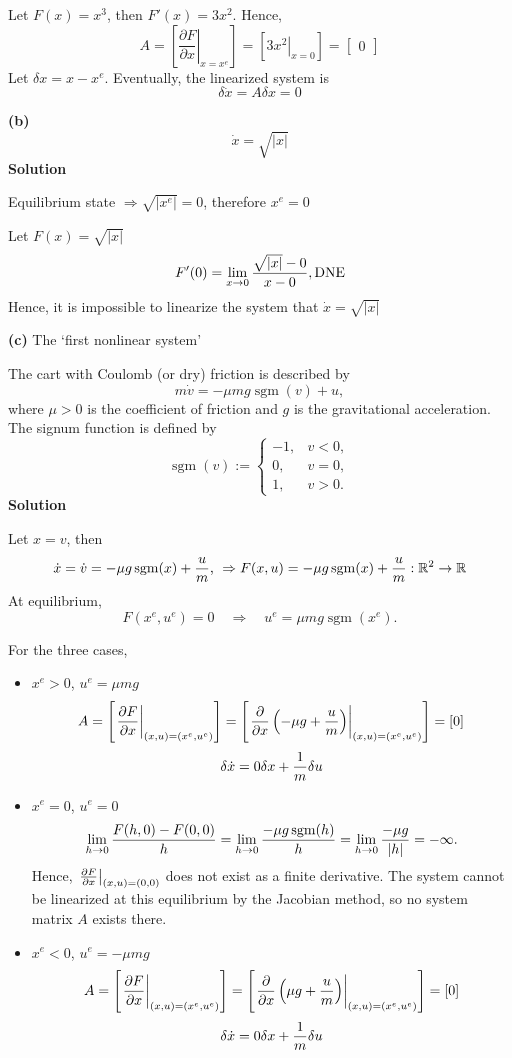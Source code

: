 \documentclass[12pt,a4paper]{article}
\begin{document}
Let $F(x) = x^3$, then $F'(x) = 3x^2$. Hence,
\[
A = \left[\left.\frac{\partial F}{\partial x}\right|_{x = x^e}\right]
= \left[\left.3x^2\right|_{x = 0}\right]
= \begin{bmatrix}0\end{bmatrix}
\]
Let $\delta x = x - x^e$. Eventually, the linearized system is
\[
\delta\dot x = A\delta x = 0
\]

\textbf{(b)}
\[\dot x=\sqrt{|x|}\]
\textbf{Solution}

Equilibrium state $\Rightarrow \sqrt{|x^e|} = 0$, therefore $x^e = 0$

Let $F(x) = \sqrt{|x|}$
\[
F'(0) = \lim_{x\to0} { \sqrt{|x|} - 0 \over x - 0}, \text{DNE}
\]
Hence, it is impossible to linearize the system that $\dot x = \sqrt{|x|}$ 

\par\vspace{1.8cm}

\textbf{(c)} The `first nonlinear system'

The cart with Coulomb (or dry) friction is described by
\[
m\dot v=-\mu mg\operatorname{sgm}(v)+u,
\]
where $\mu>0$ is the coefficient of friction and $g$ is the gravitational
acceleration. The signum function is defined by
\[
\operatorname{sgm}(v):=
\begin{cases}
-1,&v<0,\\
0,&v=0,\\
1,&v>0.
\end{cases}
\]
\textbf{Solution}

Let $x = v$, then
\[
\dot x = \dot v = -\mu g \operatorname{sgm}(x) + { u\over m} \text{, } \Rightarrow F(x, u) = -\mu g \operatorname{sgm}(x) + {u \over m}: \mathbb R^2 \to \mathbb R
\]
At equilibrium,
\[
F(x^e,u^e)=0 \quad\Rightarrow\quad u^e=\mu mg\operatorname{sgm}(x^e).
\]

For the three cases,
\begin{itemize}
	\item $x^e > 0$, $u^e = \mu mg$
	\[
	A = \left[\left.{\partial F\over\partial x}\right|_{(x,u)=(x^e,u^e)}\right]
	= \left[\left.{\partial\over\partial x}\left(-\mu g+{u\over m}\right)\right|_{(x,u)=(x^e,u^e)}\right]
	= [0]
	\]
	\[
	\delta \dot x = 0 \delta x + {1\over m} \delta u
	\]
	\item $x^e = 0$, $u^e = 0$
	\[
	\lim_{h\to0}{F(h,0)-F(0,0)\over h}
	=\lim_{h\to0}{-\mu g\operatorname{sgm}(h)\over h}
	=\lim_{h\to0}{-\mu g\over |h|}=-\infty.
	\]
	Hence, $\left.{\partial F\over\partial x}\right|_{(x,u)=(0,0)}$
	does not exist as a finite derivative. The system cannot be linearized
	at this equilibrium by the Jacobian method, so no system matrix $A$ exists there.
	\item $x^e < 0$, $ u^e = -\mu mg$
	\[
	A = \left[\left.{\partial F\over\partial x}\right|_{(x,u)=(x^e,u^e)}\right]
	= \left[\left.{\partial\over\partial x}\left(\mu g+{u\over m}\right)\right|_{(x,u)=(x^e,u^e)}\right]
	= [0]
	\]
	\[
		\delta \dot x = 0 \delta x + {1\over m} \delta u
	\]
\end{itemize}
\end{document}
